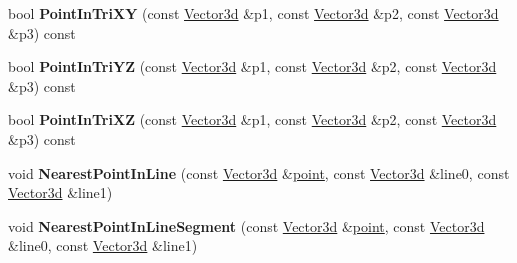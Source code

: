 \begin{DoxyCompactItemize}
\item 
\hypertarget{class_convex_decomposition_1_1_vector3d_aa0584c22945efbadfa2c147ec1e6c3e5}{bool {\bfseries Point\+In\+Tri\+X\+Y} (const \hyperlink{class_convex_decomposition_1_1_vector3d}{Vector3d} \&p1, const \hyperlink{class_convex_decomposition_1_1_vector3d}{Vector3d} \&p2, const \hyperlink{class_convex_decomposition_1_1_vector3d}{Vector3d} \&p3) const }\label{class_convex_decomposition_1_1_vector3d_aa0584c22945efbadfa2c147ec1e6c3e5}

\item 
\hypertarget{class_convex_decomposition_1_1_vector3d_a3819f58fd33500ae91bebfafe69e41e0}{bool {\bfseries Point\+In\+Tri\+Y\+Z} (const \hyperlink{class_convex_decomposition_1_1_vector3d}{Vector3d} \&p1, const \hyperlink{class_convex_decomposition_1_1_vector3d}{Vector3d} \&p2, const \hyperlink{class_convex_decomposition_1_1_vector3d}{Vector3d} \&p3) const }\label{class_convex_decomposition_1_1_vector3d_a3819f58fd33500ae91bebfafe69e41e0}

\item 
\hypertarget{class_convex_decomposition_1_1_vector3d_a6f005c5dd9091eff9ba072259025a697}{bool {\bfseries Point\+In\+Tri\+X\+Z} (const \hyperlink{class_convex_decomposition_1_1_vector3d}{Vector3d} \&p1, const \hyperlink{class_convex_decomposition_1_1_vector3d}{Vector3d} \&p2, const \hyperlink{class_convex_decomposition_1_1_vector3d}{Vector3d} \&p3) const }\label{class_convex_decomposition_1_1_vector3d_a6f005c5dd9091eff9ba072259025a697}

\item 
\hypertarget{class_convex_decomposition_1_1_vector3d_a63c24e2a3adcd3b543d5865c08d90f4e}{void {\bfseries Nearest\+Point\+In\+Line} (const \hyperlink{class_convex_decomposition_1_1_vector3d}{Vector3d} \&\hyperlink{structpoint}{point}, const \hyperlink{class_convex_decomposition_1_1_vector3d}{Vector3d} \&line0, const \hyperlink{class_convex_decomposition_1_1_vector3d}{Vector3d} \&line1)}\label{class_convex_decomposition_1_1_vector3d_a63c24e2a3adcd3b543d5865c08d90f4e}

\item 
\hypertarget{class_convex_decomposition_1_1_vector3d_af6d30e87e75634ff7a47e19d50425e3b}{void {\bfseries Nearest\+Point\+In\+Line\+Segment} (const \hyperlink{class_convex_decomposition_1_1_vector3d}{Vector3d} \&\hyperlink{structpoint}{point}, const \hyperlink{class_convex_decomposition_1_1_vector3d}{Vector3d} \&line0, const \hyperlink{class_convex_decomposition_1_1_vector3d}{Vector3d} \&line1)}\label{class_convex_decomposition_1_1_vector3d_af6d30e87e75634ff7a47e19d50425e3b}


\end{DoxyCompactItemize}

